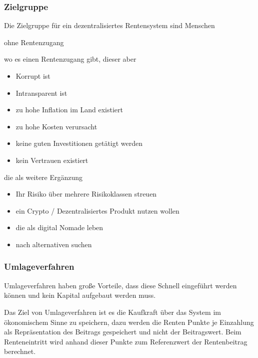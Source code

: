 \subsubsection*{Zielgruppe}

Die Zielgruppe für ein dezentralisiertes Rentensystem sind Menschen

\begin{compactenum}
\item ohne Rentenzugang
\item wo es einen Rentenzugang gibt, dieser aber 
 \begin{itemize}
 \item Korrupt ist
 \item Intransparent ist
 \item zu hohe Inflation im Land existiert
 \item zu hohe Kosten verursacht
 \item keine guten Investitionen getätigt werden
 \item kein Vertrauen existiert
 \end{itemize}
\item die als weitere Ergänzung 
 \begin{itemize}
 \item Ihr Risiko über mehrere Risikoklassen streuen
 \item ein Crypto / Dezentralisiertes Produkt nutzen wollen
 \item die als digital Nomade leben
 \item nach alternativen suchen
 \end{itemize}
\end{compactenum}

\subsubsection*{Umlageverfahren}


Umlageverfahren haben große Vorteile, dass diese Schnell eingeführt werden können und kein Kapital aufgebaut werden muss.

Das Ziel von Umlageverfahren ist es die Kaufkraft über das System im ökonomischem Sinne zu speichern, dazu werden die Renten Punkte je Einzahlung als Repräsentation des Beitrags gespeichert und nicht der Beitragswert.
Beim Renteneintritt wird anhand dieser Punkte zum Referenzwert der Rentenbeitrag berechnet. 

